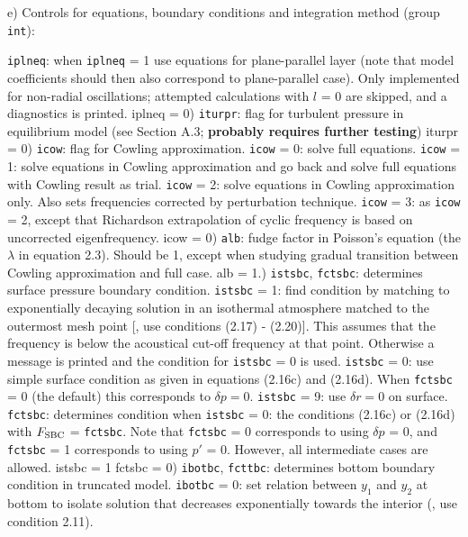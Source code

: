 \subsect
e) Controls for equations, boundary conditions and integration method
(group {\tt int}):

\param
{\tt iplneq}: when {\tt iplneq} = 1 use equations for plane-parallel layer
(note that model coefficients should then also correspond
to plane-parallel case). Only implemented for non-radial
oscillations; attempted calculations with $l$ = 0 are
skipped, and a diagnostics is printed.
{ iplneq = 0})
\param
{\tt iturpr}: flag for turbulent pressure in equilibrium model
(see Section A.3; {\bf probably requires further testing})
{ iturpr = 0})
\param
{\tt icow}: flag for Cowling approximation.
\pparam
{\tt icow} = 0: solve full equations.
\pparam
{\tt icow} = 1: solve equations in Cowling approximation and go back
and solve full equations with Cowling result as trial.
\pparam
{\tt icow} = 2: solve equations in Cowling approximation only. Also sets
frequencies corrected by perturbation technique.
\pparam
{\tt icow} = 3: as {\tt icow} = 2, except that Richardson extrapolation of
cyclic frequency is based on uncorrected eigenfrequency.
{ icow = 0})
\param
{\tt alb}: fudge factor in Poisson's equation (the $\lambda$ in equation
2.3). Should be 1, except
when studying gradual transition between Cowling approximation
and full case.
{ alb = 1.})
\param
{\tt istsbc}, {\tt fctsbc}: determines surface pressure boundary condition.
\pparam
{\tt istsbc} = 1: find condition by matching to exponentially
decaying solution in an isothermal atmosphere matched to
the outermost mesh point [{\ie}, use conditions (2.17) - (2.20)].
This assumes that the frequency is
below the acoustical cut-off frequency at that point.
Otherwise a message is printed and the condition for 
{\tt istsbc} = 0 is used.
\pparam
{\tt istsbc} = 0: use simple surface condition as given in
equations (2.16c) and (2.16d).
When {\tt fctsbc} = 0 (the default) this corresponds to $\delta p = 0$.
\pparam
{\tt istsbc} = 9: use $\delta r = 0$ on surface.
\pparam
{\tt fctsbc}: determines condition when {\tt istsbc} = 0:
the conditions (2.16c) or (2.16d) with $F_{\rm SBC}$ = {\tt fctsbc}.
Note that {\tt fctsbc} = 0 corresponds to using $\delta p$ = 0,
and {\tt fctsbc} = 1 corresponds to using $p '$ = 0. 
However, all intermediate cases are allowed.
{ istsbc = 1
fctsbc = 0})
\param
{\tt ibotbc}, {\tt fcttbc}: determines bottom boundary condition in truncated
model.
\pparam
{\tt ibotbc} = 0: set relation between $y_1$ and $y_2$ 
at bottom to isolate
solution that decreases exponentially towards the interior ({\ie},
use condition 2.11).
